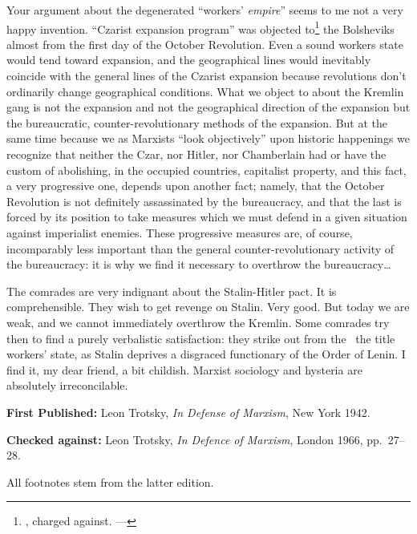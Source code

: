 Your argument about the degenerated “workers’ \emph{empire}” seems to me not a very happy invention. “Czarist expansion program” was objected to\footnote{\ie, charged against. ---\ed} the Bolsheviks almost from the first day of the October Revolution. Even a sound workers state would tend toward expansion, and the geographical lines would inevitably coincide with the general lines of the Czarist expansion because revolutions don’t ordinarily change geographical conditions. What we object to about the Kremlin gang is not the expansion and not the geographical direction of the expansion but the bureaucratic, counter-revolutionary methods of the expansion. But at the same time because we as Marxists “look objectively” upon historic happenings we recognize that neither the Czar, nor Hitler, nor Chamberlain had or have the custom of abolishing, in the occupied countries, capitalist property, and this fact, a very progressive one, depends upon another fact; namely, that the October Revolution is not definitely assassinated by the bureaucracy, and that the last is forced by its position to take measures which we must defend in a given situation against imperialist enemies. These progressive measures are, of course, incomparably less important than the general counter-revolutionary activity of the bureaucracy: it is why we find it necessary to overthrow the bureaucracy\dots

The comrades are very indignant about the Stalin-Hitler pact. It is comprehensible. They wish to get revenge on Stalin. Very good. But today we are weak, and we cannot immediately overthrow the Kremlin. Some comrades try then to find a purely verbalistic satisfaction: they strike out from the \USSR\ the title workers’ state, as Stalin deprives a disgraced functionary of the Order of Lenin. I find it, my dear friend, a bit childish. Marxist sociology and hysteria are absolutely irreconcilable.


\newpage

\begin{letterinfo}
	\textbf{First Published:} Leon Trotsky, \emph{In Defense of Marxism}, New York 1942.
	
	\textbf{Checked against:} Leon Trotsky, \emph{In Defence of Marxism}, London 1966, pp.~27--28.
	
	All footnotes stem from the latter edition.
\end{letterinfo}
